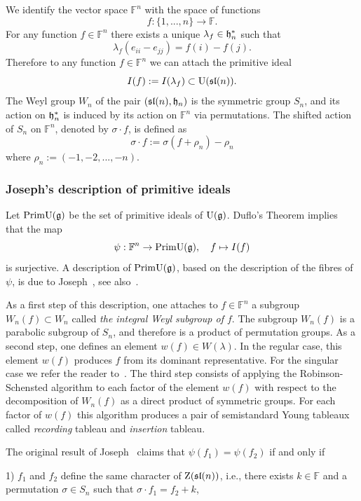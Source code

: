 \documentclass[10pt]{amsart}\oddsidemargin -1mm \evensidemargin -1mm \topmargin -15mm\headheight5mm \headsep 3.5mm \textheight 245mm\textwidth 170mm
\theoremstyle{definition}\newtheorem{theorem}{Theorem}[section]\newtheorem{lemma}[theorem]{Lemma}\newtheorem{remark}[theorem]{Remark}\newtheorem{proposition}[theorem]{Proposition}\newtheorem{corollary}[theorem]{Corollary}\newtheorem{definition}[theorem]{Definition}\newtheorem{Ex}[theorem]{Example}\newtheorem{obs}[theorem]{Observation}\newtheorem{nota}[theorem]{Notation}
\begin{document}
We identify the vector space $\mathbb F^n$ with the space of functions
$$f: \{1,..., n\}\to \mathbb F.$$
For any function $f\in\mathbb F^n$ there exists a unique $\lambda_f\in\frak h_n^*$ such that
$$\lambda_f(e_{ii}-e_{jj})=f(i)-f(j).$$
Therefore to any function $f\in\mathbb F^n$ we can attach the primitive ideal
$$I(f):=I(\lambda_f)\subset{\rm U}(\frak{sl}(n)).$$
The Weyl group $W_n$ of the pair $(\frak{sl}(n), \frak h_n)$ is the symmetric group $S_n$, and its action on $\frak h_n^*$ is induced by its action on $\mathbb F^n$ via permutations. %
The shifted action of $S_n$ on $\mathbb F^n$, denoted by $\sigma\cdot f$, is defined as $$\sigma\cdot f:=\sigma(f+\rho_n)-\rho_n$$ where $\rho_n:=(-1, -2,..., -n)$.  
\subsubsection{Joseph's description of primitive ideals} Let ${\rm Prim}{\rm U}(\frak g)$ be the set of primitive ideals of ${\rm U}(\frak g)$. %
Duflo's Theorem implies that the map
$$\psi:\mathbb F^n\to{\rm Prim} {\rm U}(\frak g), \hspace{10pt}f\mapsto I(f)$$
is surjective. 
A description of ${\rm Prim}{\rm U}(\frak g)$, based on the description of the fibres of $\psi$, is due to Joseph~\cite{Jo}, see also~\cite{BJ, BV1, Jo, Jo2}.

As a first step of this description, one attaches to $f\in\mathbb F^n$ a subgroup $W_n(f)\subset W_n$ called {\it the integral Weyl subgroup of $f$}. 
The subgroup $W_n(f)$ is a parabolic subgroup of $S_n$, and therefore is a product of permutation groups.  
As a second step, one defines an element $w(f)\in W(\lambda)$. 
In the regular case, this element $w(f)$ produces $f$ from its dominant representative. 
For the singular case we refer the reader to~\cite{BJ}. 
The third step consists of applying the Robinson-Schensted algorithm to each factor of the element $w(f)$ with respect to the decomposition of $W_n(f)$ as a direct product of symmetric groups. 
For each factor of $w(f)$ this algorithm produces a pair of semistandard  Young tableaux called {\it recording} tableau and {\it insertion} tableau. 

The original result of Joseph~\cite{Jo1} claims that $\psi(f_1)=\psi(f_2)$ if and only if

1) $f_1$ and $f_2$ define the same character of ${\rm Z}(\frak{sl}(n))$, i.e., there exists $k\in\mathbb F$ and a permutation $\sigma\in S_n$ such that $\sigma\cdot f_1=f_2+k$,
\end{document}
